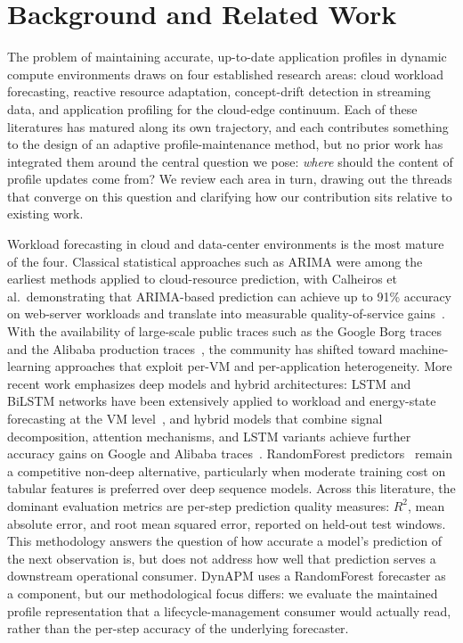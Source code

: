 \documentclass[manuscript,screen,review,anonymous]{acmart}
\begin{document}
\section{Background and Related Work}\label{sec:bg}

The problem of maintaining accurate, up-to-date application
profiles in dynamic compute environments draws on four
established research areas: cloud workload forecasting, reactive
resource adaptation, concept-drift detection in streaming data,
and application profiling for the cloud-edge continuum. Each of
these literatures has matured along its own trajectory, and
each contributes something to the design of an adaptive
profile-maintenance method, but no prior work has integrated
them around the central question we pose: \emph{where} should
the content of profile updates come from? We review each area
in turn, drawing out the threads that converge on this question
and clarifying how our contribution sits relative to existing
work.

Workload forecasting in cloud and data-center environments is
the most mature of the four. Classical statistical approaches
such as ARIMA were among the earliest methods applied to
cloud-resource prediction, with Calheiros et al.\ demonstrating
that ARIMA-based prediction can achieve up to 91\% accuracy on
web-server workloads and translate into measurable
quality-of-service gains~\cite{calheiros_arima_2015}. With the
availability of large-scale public traces such as the Google
Borg traces~\cite{tirmazi_borg_2020} and the Alibaba production
traces~\cite{lu_alibaba_2017}, the community has shifted toward
machine-learning approaches that exploit per-VM and
per-application heterogeneity. More recent work emphasizes deep
models and hybrid architectures: LSTM and BiLSTM networks have
been extensively applied to workload and energy-state
forecasting at the VM
level~\cite{khan_workload_forecasting_2022}, and hybrid models
that combine signal decomposition, attention mechanisms, and
LSTM variants achieve further accuracy gains on Google and
Alibaba traces~\cite{bi_hybrid_lstm_2023}. RandomForest
predictors~\cite{breiman_random_forests_2001} remain a
competitive non-deep alternative, particularly when moderate
training cost on tabular features is preferred over deep sequence
models. Across this literature, the
dominant evaluation metrics are per-step prediction quality
measures: $R^2$, mean absolute error, and root mean squared
error, reported on held-out test windows. This methodology
answers the question of how accurate a model's prediction of
the next observation is, but does not address how well that
prediction serves a downstream operational consumer. DynAPM
uses a RandomForest forecaster as a component, but our
methodological focus differs: we evaluate the maintained
profile representation that a lifecycle-management consumer
would actually read, rather than the per-step accuracy of the
underlying forecaster.
\end{document}
